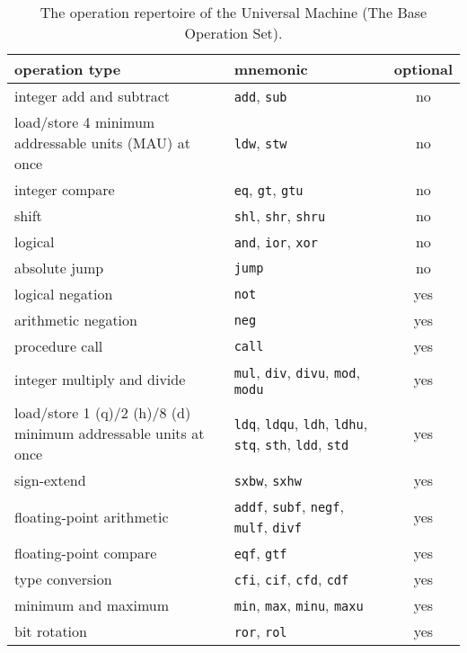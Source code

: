 \documentclass[twoside]{tce}
\begin{document}
\begin{table}[tb]
\begin{tabular}{|l|l|c|}
  \hline
  operation type & mnemonic  & optional\\
  \hline
  integer add and subtract    &
    \texttt{add}, \texttt{sub} & no \\
  load/store 4 minimum addressable units (MAU) at once & 
    \texttt{ldw}, \texttt{stw} & no \\
  integer compare             &
    \texttt{eq}, \texttt{gt}, \texttt{gtu} & no \\
  shift                       &
    \texttt{shl}, \texttt{shr}, \texttt{shru} & no \\
  logical                     &
    \texttt{and}, \texttt{ior}, \texttt{xor} & no \\
  absolute jump       &
    \texttt{jump} & no \\
  logical negation            &
    \texttt{not}  & yes \\
  arithmetic negation         &
    \texttt{neg} & yes \\
  procedure call &
    \texttt{call} & yes \\
  integer multiply and divide &
    \texttt{mul}, \texttt{div}, \texttt{divu}, \texttt{mod},
    \texttt{modu} & yes \\
  load/store 1 (q)/2 (h)/8 (d) minimum addressable units at once
     &
    \texttt{ldq}, \texttt{ldqu}, \texttt{ldh}, \texttt{ldhu}, \texttt{stq},
    \texttt{sth}, \texttt{ldd}, \texttt{std} & yes \\
  sign-extend                 &
    \texttt{sxbw}, \texttt{sxhw} & yes \\
  floating-point arithmetic   &
    \texttt{addf}, \texttt{subf}, \texttt{negf}, \texttt{mulf},
    \texttt{divf}  & yes \\
  floating-point compare      &
    \texttt{eqf}, \texttt{gtf} & yes \\
  type conversion             &
    \texttt{cfi}, \texttt{cif}, \texttt{cfd}, \texttt{cdf} & yes \\
  minimum and maximum         &
    \texttt{min}, \texttt{max}, \texttt{minu}, \texttt{maxu} & yes \\
  bit rotation                &
    \texttt{ror}, \texttt{rol} & yes \\
  \hline
\end{tabular}
\caption{The operation repertoire of the Universal Machine (The Base
Operation Set).}
\label{tab:op-repertoire}
\end{table}
\end{document}
